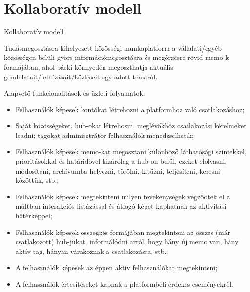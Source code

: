 \section{Kollaboratív modell}

\begin{frame}{Kollaboratív modell}

    Tudásmegosztásra kihelyezett közösségi munkaplatform a vállalati/egyéb közösségen belüli gyors információmegosztásra és megőrzésre rövid memo-k formájában, ahol bárki könnyedén megoszthatja aktuális gondolatait/felhívásait/közléseit egy adott témáról.

    \medbreak

    Alapvető funkcionalitások és üzleti folyamatok:
    \begin{itemize}
        \item Felhasználók képesek kontókat létrehozni a platformhoz való csatlakozáshoz;
        \item Saját közösségeket, hub-okat létrehozni, meglévőkhöz csatlakozási kérelmeket leadni; tagokat adminisztrátor felhasználók menedzselhetik;
        \item Felhasználók képesek memo-kat megosztani különböző láthatósági szintekkel, prioritásokkal és határidővel kizárólag a hub-on belül, ezeket elolvasni, módosítani, archívumba helyezni, törölni, kitűzni, teljesíteni, keresni közöttük, stb.;
        \item Felhasználók képesek megtekinteni milyen tevékenységek végződtek el a múltban interakciós listázással és átfogó képet kaphatnak az aktivitási hőtérképpel;
        \item Felhasználók képesek összegzés formájában megtekinteni az összes (már csatlakozott) hub-jukat, informálódni arról, hogy hány új memo van, hány aktív tag, hányan várakoznak a csatlakozásra, stb.;
        \item A felhasználók képesek az éppen aktív felhasználókat megtekinteni;
        \item A felhasználók értesítéseket kapnak a platformbéli érdekes eseményekről.
    \end{itemize}

\end{frame}